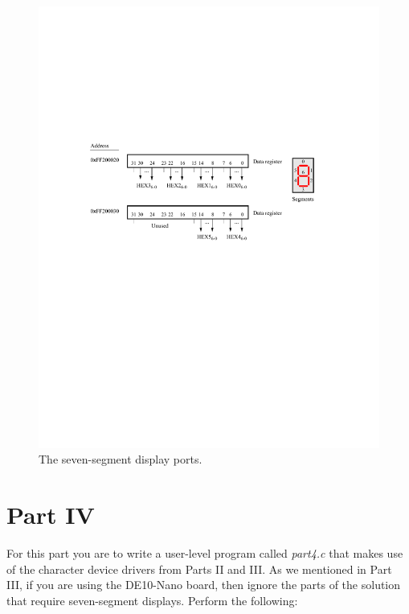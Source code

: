 \documentclass[epsfig,10pt,fullpage]{article}
\begin{document}
\begin{figure}[H]
   \begin{center}
       \includegraphics{figures/fig_segment_port.pdf}
   \end{center}
	\caption{The seven-segment display ports.}
\label{fig:HEX}
\end{figure}

\section*{Part IV}
\noindent
For this part you are to write a user-level program called {\it part4.c} that makes use of the 
character device drivers from Parts II and III. As we mentioned in Part III, if you are
using the DE10-Nano board, then ignore the parts of the solution that require
seven-segment displays. Perform the following:
\end{document}
